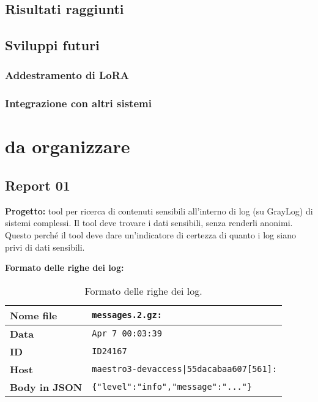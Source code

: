 \documentclass[12pt]{report}
\begin{document}
\section{Risultati raggiunti}
\label{sec:risultati_raggiunti}
\section{Sviluppi futuri}
\label{sec:sviluppi_futuri}
\subsection{Addestramento di LoRA}
\label{subsec:addestramento_lora}
\subsection{Integrazione con altri sistemi}
\label{subsec:integrazione_sistemi}

\chapter{da organizzare}
\label{chap:da_organizzare}

\section{Report 01}
\label{sec:report01}

\textbf{Progetto:} tool per ricerca di contenuti sensibili all'interno di log (su GrayLog) di sistemi complessi.
Il tool deve trovare i dati sensibili, senza renderli anonimi. Questo perché il tool deve dare un'indicatore di certezza di quanto i log siano privi di dati sensibili.

\textbf{Formato delle righe dei log:}


\begin{table}[h!]
    \centering
    \begin{tabular}{|l|l|}
        \hline
        \textbf{Nome file}    & \texttt{messages.2.gz:}                        \\ \hline
        \textbf{Data}         & \texttt{Apr 7 00:03:39}                        \\ \hline
        \textbf{ID}           & \texttt{ID24167}                               \\ \hline
        \textbf{Host}         & \texttt{maestro3-devaccess|55dacabaa607[561]:} \\ \hline
        \textbf{Body in JSON} & \texttt{\{"level":"info","message":"..."\}}    \\ \hline
    \end{tabular}
    \caption{Formato delle righe dei log.}
\end{table}
\end{document}
